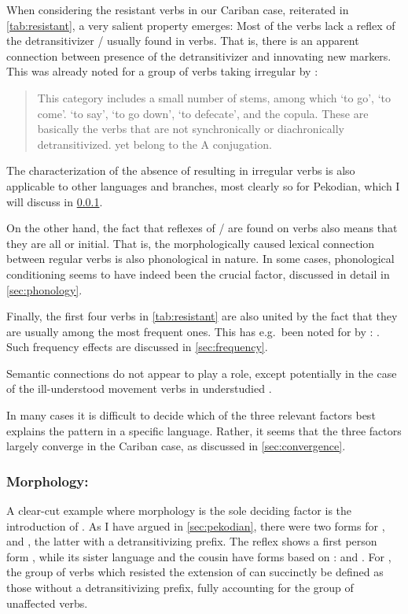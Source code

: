 When considering the resistant verbs in our Cariban case, reiterated in \cref{tab:resistant}, a very salient property emerges:
Most of the verbs lack a reflex of the detransitivizer / usually found in   verbs.
That is, there is an apparent connection between presence of the detransitivizer and innovating new  markers.
This was already noted for a group of \PTar verbs taking irregular  by \textcite[112]{meira1998proto}:
\begin{quotation}
	This category includes a small number of stems, among which ‘to go’, ‘to come’. ‘to say’, ‘to go down’, ‘to defecate', and the copula. These are basically the verbs that are not synchronically or diachronically detransitivized. yet belong to the A conjugation.
\end{quotation}
The characterization of the absence of \detrz resulting in irregular verbs is also applicable to other languages and branches, most clearly so for Pekodian, which I will discuss in \cref{sec:morphology}.

On the other hand, the fact that reflexes of / are found on   verbs also means that they are all  or  initial.
That is, the morphologically caused lexical connection between regular  verbs is also phonological in nature.
In some cases, phonological conditioning seems to have indeed been the crucial factor, discussed in detail in \cref{sec:phonology}.

Finally, the first four verbs in \cref{tab:resistant} are also united by the fact that they are usually among the most frequent ones.
This has e.g.\ been noted for \kalina by \textcite[75]{courtz2008carib}: .
Such frequency effects are discussed in \cref{sec:frequency}.

Semantic connections do not appear to play a role, except potentially in the case of the ill-understood movement verbs in understudied \akuriyo.

In many cases it is difficult to decide which of the three relevant factors best explains the pattern in a specific language.
Rather, it seems that the three factors largely converge in the Cariban case, as discussed in \cref{sec:convergence}.


\subsubsection{Morphology: \PPek}
\label{sec:morphology}
A clear-cut example where morphology is the sole deciding factor is the introduction of \PPek {}.
As I have argued in \cref{sec:pekodian}, there were two forms for ,  and , the latter with a detransitivizing prefix.
The \arara reflex shows a first person form , while its sister language \ikpeng and the cousin \bakairi have forms based on :  and .
For \PPek, the group of verbs which resisted the extension of  can succinctly be defined as those without a detransitivizing prefix, fully accounting for the group of unaffected verbs.

